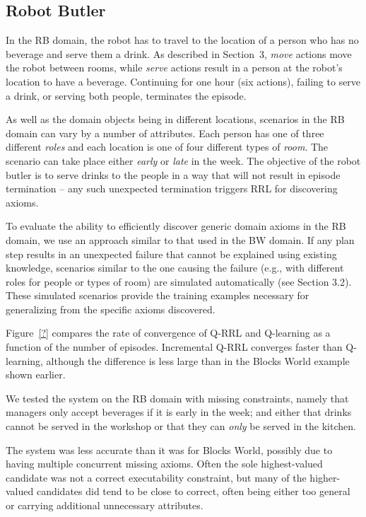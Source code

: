 


\subsection{Robot Butler}

In the RB domain, the robot has to travel to the location of a person who 
has no beverage and serve them a drink. As described in Section~3, 
\textit{move} actions move the robot between rooms, while \textit{serve} 
actions result in a person at the robot's location to have a beverage. 
Continuing for one hour (six actions), failing to serve a drink, or serving 
both people, terminates the episode.

As well as the domain objects being in different locations, scenarios in the RB 
domain can vary by a number of attributes. 
Each person has one of three different \textit{roles} and each location is one 
of four different types of \textit{room}. The scenario can take place either 
\textit{early} or \textit{late} in the week. 
The objective of the robot butler is to serve drinks to the people in a way 
that will not result in episode termination -- any such unexpected termination 
triggers RRL for discovering axioms.

To evaluate the ability to efficiently discover generic domain axioms in the RB 
domain, we use an approach similar to that used in the BW domain. If any plan 
step results in an unexpected failure that cannot be explained using existing 
knowledge, scenarios similar to the one causing the failure (e.g., with different 
roles for people or types of room) are simulated automatically (see Section 3.2). 
These simulated scenarios provide the training examples necessary for 
generalizing from the specific axioms discovered. 

Figure~\ref{?} compares the rate of convergence of Q-RRL and Q-learning as 
a function of the number of episodes. Incremental Q-RRL converges faster than 
Q-learning, although the difference is less large than in the Blocks World example 
shown earlier. 

We tested the system on the RB domain with missing constraints, 
namely that managers only accept beverages if it is early in the week; 
and either that drinks cannot be served in the 
workshop or that they can \textit{only} be served in the kitchen.

The system was less accurate than it was for Blocks World, 
possibly due to having multiple concurrent missing axioms. 
Often the sole highest-valued candidate was not a correct executability constraint, 
but many of the higher-valued candidates did tend to be close to correct, often 
being either too general or carrying additional unnecessary attributes.

